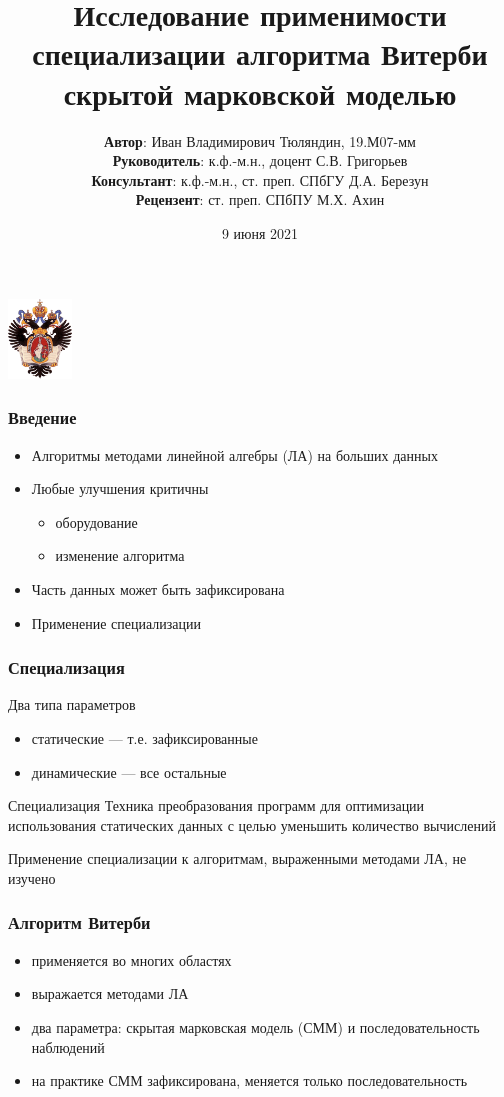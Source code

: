 \documentclass{beamer}
\title[Специализация алгоритма Витерби]{Исследование применимости специализации алгоритма Витерби скрытой марковской моделью}
\institute[СПбГУ]{
Санкт-Петербургский Государственный Университет\\
Кафедра системного программирования}
\author[Иван Тюляндин]{
\textbf{Автор}: Иван Владимирович Тюляндин, 19.М07-мм
\\
\textbf{Руководитель}: к.ф.-м.н., доцент С.В. Григорьев
\\
\textbf{Консультант}: к.ф.-м.н., ст. преп. СПбГУ Д.А. Березун
\\
\textbf{Рецензент}: ст. преп. СПбПУ М.Х. Ахин}
\date{9 июня 2021}
\begin{document}
{
\begin{frame}
\begin{center}
  \includegraphics[width=1.7cm]{SPbGU_Logo.png}
\vspace{-3pt}
\hspace{-10pt}
\titlepage
\end{center}

\end{frame}
}


\begin{frame}[fragile]
	\frametitle{Введение}
	\begin{itemize}
		\item Алгоритмы методами линейной алгебры (ЛА) на больших данных
		\vfill
		\item Любые улучшения критичны
			\begin{itemize}
				\vfill
				\item оборудование
				\vfill
				\item изменение алгоритма
			\end{itemize}
		\vfill	
		\item Часть данных может быть зафиксирована
		\vfill	
		\item Применение специализации
	\end{itemize}
\end{frame}


\begin{frame}[fragile]
	\frametitle{Специализация}
	Два типа параметров
	\begin{itemize}
		\item статические --- т.е. зафиксированные
		\item динамические --- все остальные
	\end{itemize}
	\vfill
	\begin{block}{Специализация}
		Техника преобразования программ для оптимизации использования статических данных с целью уменьшить количество вычислений
	\end{block}
	\vfill
	Применение специализации к алгоритмам, выраженными методами ЛА, не изучено
\end{frame}

\begin{frame}[fragile]
	\frametitle{Алгоритм Витерби}
	\begin{itemize}
		\item применяется во многих областях
		\vfill
		\item выражается методами ЛА
		\vfill
		\item два параметра: скрытая марковская модель (СММ) и последовательность наблюдений
		\vfill
		\item на практике СММ зафиксирована, меняется только последовательность
	\end{itemize}
\end{frame}
\end{document}
